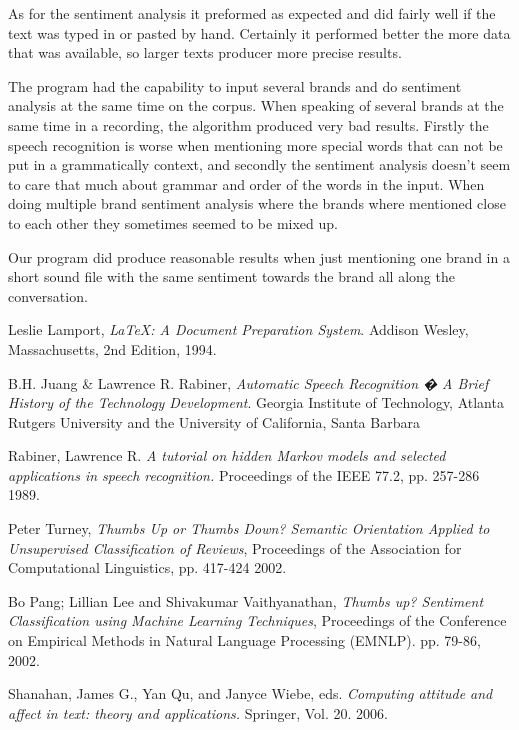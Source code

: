 \documentclass[a4paper,12pt,twoside]{ltxdoc}
\begin{document}
As for the sentiment analysis it preformed as expected and did fairly well if the text was typed in or pasted by hand. Certainly it performed better the more data that was available, so larger texts producer more precise results. 

The program had the capability to input several brands and do sentiment analysis at the same time on the corpus. When speaking of several brands at the same time in a recording, the algorithm produced very bad results. Firstly the speech recognition is worse when mentioning more special words that can not be put in a grammatically context, and secondly the sentiment analysis doesn't seem to care that much about grammar and order of the words in the input. When doing multiple brand sentiment analysis where the brands where mentioned close to each other they sometimes seemed to be mixed up. 

Our program did produce reasonable results when just mentioning one brand in a short sound file with the same sentiment towards the brand all along the conversation. 

\newpage 

\begin{thebibliography}{9}

  Leslie Lamport,
  \emph{\LaTeX: A Document Preparation System}.
  Addison Wesley, Massachusetts,
  2nd Edition,
  1994.
  
  B.H. Juang \& Lawrence R. Rabiner,
  \emph{Automatic Speech Recognition � A Brief History of the Technology Development}.
  Georgia Institute of Technology, Atlanta
  Rutgers University and the University of California, Santa Barbara
  
Rabiner, Lawrence R.
\emph{A tutorial on hidden Markov models and selected applications in speech recognition.}
Proceedings of the IEEE 77.2,
pp. 257-286
1989.

Peter Turney, 
\emph{Thumbs Up or Thumbs Down? Semantic Orientation Applied to Unsupervised Classification of Reviews},
 Proceedings of the Association for Computational Linguistics,
 pp. 417-424
 2002.

  Bo Pang; Lillian Lee and Shivakumar Vaithyanathan,
  \emph{Thumbs up? Sentiment Classification using Machine Learning Techniques},
  Proceedings of the Conference on Empirical Methods in Natural Language Processing (EMNLP).
  pp. 79-86,
  2002.

  Shanahan, James G., Yan Qu, and Janyce Wiebe, eds.
  \emph{Computing attitude and affect in text: theory and applications.}
  Springer, 
  Vol. 20.
  2006.

\end{thebibliography}
\end{document}
